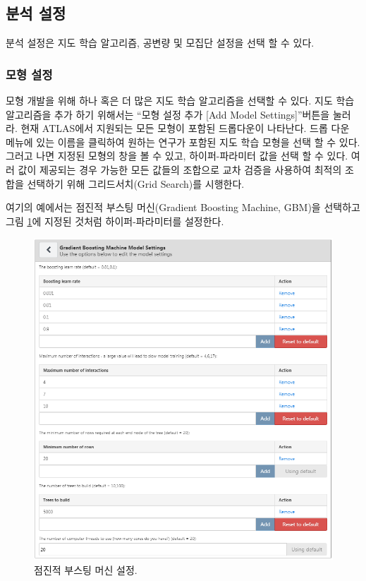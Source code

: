 \documentclass[11pt]{book}
\theoremstyle{definition}
\theoremstyle{definition}
\theoremstyle{definition}
\theoremstyle{remark}
\begin{document}
\subsection{분석 설정}\label{-}

분석 설정은 지도 학습 알고리즘, 공변량 및 모집단 설정을 선택 할 수 있다.

\subsubsection*{모형 설정}\label{-}

모형 개발을 위해 하나 혹은 더 많은 지도 학습 알고리즘을 선택할 수 있다.
지도 학습 알고리즘을 추가 하기 위해서는 ``모형 설정 추가 {[}Add Model
Settings{]}''버튼을 눌러라. 현재 ATLAS에서 지원되는 모든 모형이 포함된
드롭다운이 나타난다. 드롭 다운 메뉴에 있는 이름을 클릭하여 원하는 연구가
포함된 지도 학습 모형을 선택 할 수 있다. 그러고 나면 지정된 모형의 창을
볼 수 있고, 하이퍼-파라미터 값을 선택 할 수 있다. 여러 값이 제공되는
경우 가능한 모든 값들의 조합으로 교차 검증을 사용하여 최적의 조합을
선택하기 위해 그리드서치(Grid Search)를 시행한다.

여기의 예에서는 점진적 부스팅 머신(Gradient Boosting Machine, GBM)을
선택하고 그림 \ref{fig:gbmSettings}에 지정된 것처럼 하이퍼-파라미터를
설정한다.

\begin{figure}

{\centering \includegraphics[width=1\linewidth]{images/PatientLevelPrediction/gbmSettings} 

}

\caption{점진적 부스팅 머신 설정.}\label{fig:gbmSettings}
\end{figure}
\end{document}
